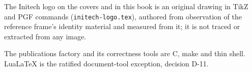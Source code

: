 \begin{minipage}[b]{\imFullWidth}
The Initech logo on the covers and in this book is an original drawing in
TikZ and PGF commands (\texttt{initech-logo.tex}), authored from
observation of the reference frame's identity material and measured from
it; it is not traced or extracted from any image.

The publications factory and its correctness tools are C, make and thin
shell.  LuaLaTeX is the ratified document-tool exception, decision D-11.
\end{minipage}
\par
